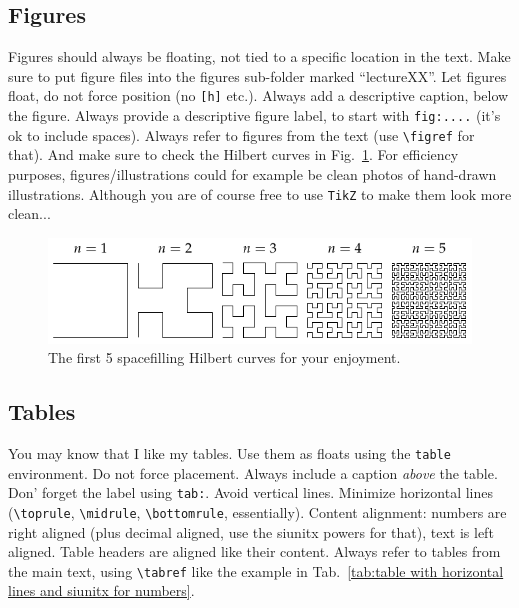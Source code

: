 \documentclass[11pt]{article}
\newcommand{\figref}[1]{Fig.~\ref{#1}}
\newcommand{\tabref}[1]{Tab.~\ref{#1}}
\begin{document}
\subsection{Figures}\label{sec:figures}
Figures should always be floating, not tied to a specific location in the text. Make sure to put figure files into the figures sub-folder marked ``lectureXX''. Let figures float, do not force position (no \verb|[h]| etc.). Always add a descriptive caption, below the figure. Always provide a descriptive figure label, to start with \verb|fig:....| (it's ok to include spaces). Always refer to figures from the text (use \verb|\figref| for that). And make sure to check the Hilbert curves in \figref{fig:hilbert curves}. For efficiency purposes, figures/illustrations could for example be clean photos of hand-drawn illustrations. Although you are of course free to use \verb|TikZ| to make them look more clean...

\begin{figure}
    \centering
    \includegraphics{figures/hilbertcurves.pdf}
    \caption{The first 5 spacefilling Hilbert curves for your enjoyment.}
    \label{fig:hilbert curves}
\end{figure}

\subsection{Tables}
You may know that I like my tables. Use them as floats using the \verb|table| environment. Do not force placement. Always include a caption \emph{above} the table. Don' forget the label using \verb|tab:|. Avoid vertical lines. Minimize horizontal lines (\verb|\toprule|, \verb|\midrule|, \verb|\bottomrule|, essentially). Content alignment: numbers are right aligned (plus decimal aligned, use the siunitx powers for that), text is left aligned. Table headers are aligned like their content. Always refer to tables from the main text, using \verb|\tabref| like the example in \tabref{tab:table with horizontal lines and siunitx for numbers}.
\end{document}
